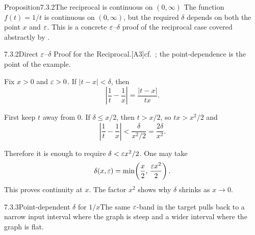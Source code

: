 \documentclass[main.tex]{subfiles}
\begin{document}
\begin{Obj}{Proposition}{7.3.2}{The reciprocal is continuous on $(0,\infty)$}
The function $f(t)=1/t$ is continuous on $(0,\infty)$, but the required $\delta$ depends on both
the point $x$ and $\varepsilon$.
This is a concrete $\varepsilon$--$\delta$ proof of the reciprocal case covered abstractly by
.
\end{Obj}
\begin{Prf}{7.3.2}{Direct $\varepsilon$--$\delta$ Proof for the Reciprocal.}{[A3]\quad cf.\ ; the point-dependence is the point of the example.}
\item Fix $x>0$ and $\varepsilon>0$. If $|t-x|<\delta$, then
  \[
    \left|\frac1t-\frac1x\right|=\frac{|t-x|}{tx}.
  \]
\item First keep $t$ away from $0$. If $\delta\le x/2$, then $t>x/2$, so
  $tx>x^2/2$ and
  \[
    \left|\frac1t-\frac1x\right|
    <\frac{\delta}{x^2/2}
    =\frac{2\delta}{x^2}.
  \]
\item Therefore it is enough to require $\delta<\varepsilon x^2/2$. One may take
  \[
    \delta(x,\varepsilon)=\min\!\left(\frac{x}{2},\,\frac{\varepsilon x^2}{2}\right).
  \]
  This proves continuity at $x$. The factor $x^2$ shows why $\delta$ shrinks as $x\to0$.
\end{Prf}

\begin{Fig}{7.3.3}{Point-dependent $\delta$ for $1/x$}{The same $\varepsilon$-band in the target pulls
back to a narrow input interval where the graph is steep and a wider interval where the graph is
flat.}
\end{Fig}
\end{document}
